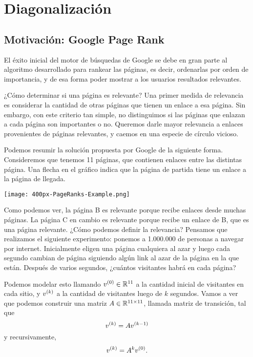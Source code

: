 \chapter{Diagonalización}

\section{Motivación: Google Page Rank}

El éxito inicial del motor de búsquedas de Google se debe en gran parte al algoritmo desarrollado para rankear las páginas, es decir, ordenarlas por orden de importancia, y de esa forma poder mostrar a los usuarios resultados relevantes.

¿Cómo determinar si una página es relevante? Una primer medida de relevancia es considerar la cantidad de otras páginas que tienen un enlace a esa página. Sin embargo, con este criterio tan simple, no distinguimos si las páginas que enlazan a cada página son importantes o no. Queremos darle mayor relevancia a enlaces provenientes de páginas relevantes, y caemos en una especie de círculo vicioso.

Podemos resumir la solución propuesta por Google de la siguiente forma.
Consideremos que tenemos 11 páginas, que contienen enlaces entre las distintas página. Una flecha en el gráfico indica que la página de partida tiene un enlace a la página de llegada.

\begin{center}
\texttt{[image: 400px-PageRanks-Example.png]}
\end{center}

Como podemos ver, la página B es relevante porque recibe enlaces desde muchas páginas. La página C en cambio es relevante porque recibe un enlace de B, que es una página relevante. ¿Cómo podemos definir la relevancia?
Pensamos que realizamos el siguiente experimento: ponemos a 1.000.000 de personas a navegar por internet. Inicialmente eligen una página cualquiera al azar y luego cada segundo cambian de página siguiendo algún link al azar de la página en la que están.
Después de varios segundos, ¿cuántos visitantes habrá en cada página?

Podemos modelar esto llamando $\vb^{(0)} \in \R^{11}$ a la cantidad inicial de visitantes en cada sitio, y $\vb^{(k)}$ a la cantidad de visitantes luego de $k$ segundos. Vamos a ver que podemos construir una matriz $\Ab \in \R^{11 \times 11}$, llamada matriz de transición, tal que
$$
\vb^{(k)} = \Ab \vb^{(k-1)}
$$
y recursivamente,
$$
\vb^{(k)} = \Ab^k \vb^{(0)}.
$$

